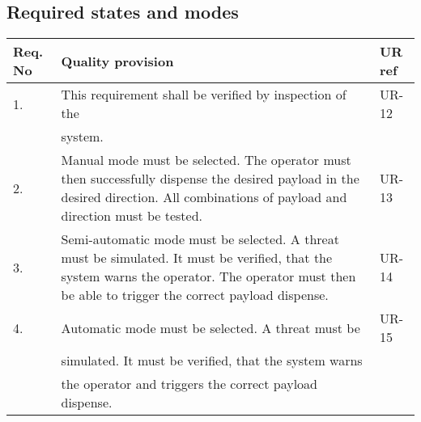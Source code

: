 \subsection{Required states and modes}
\begin{center}
    \begin{tabular}{ | l | p{9cm} | l |}
    \hline	  
    Req. No & Quality provision  									& UR ref \\ \hline
		1. & This requirement shall be verified by inspection of the  & UR-12 \\
            & system.                                               &\\ \hline
		2. & Manual mode must be selected. The operator must then successfully dispense the desired payload in the desired direction. All combinations of payload and direction must be tested.                               &UR-13\\ \hline
		3. & Semi-automatic mode must be selected. A threat must be simulated. It must be verified, that the system warns the operator. The operator must then be able to trigger the correct payload dispense.                     &UR-14\\ \hline
        4. & Automatic mode must be selected. A threat must be     & UR-15 \\
			& simulated. It must be verified, that the system warns &\\
			& the operator and triggers the correct payload dispense.&\\ \hline	
    \end{tabular}
\end{center}

